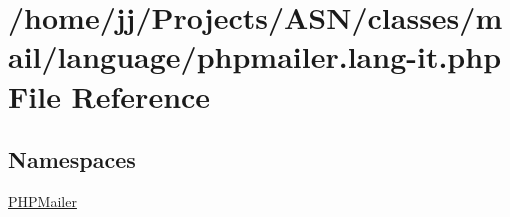 \hypertarget{phpmailer_8lang-it_8php}{}\section{/home/jj/\+Projects/\+A\+S\+N/classes/mail/language/phpmailer.lang-\/it.php File Reference}
\label{phpmailer_8lang-it_8php}
\subsection*{Namespaces}
\begin{DoxyCompactItemize}
\item 
 \hyperlink{namespace_p_h_p_mailer}{P\+H\+P\+Mailer}
\end{DoxyCompactItemize}
